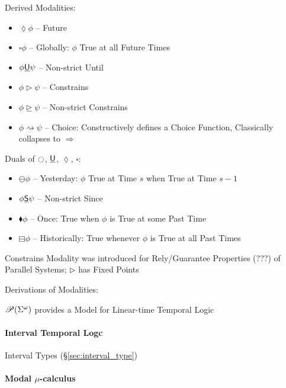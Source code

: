 Derived Modalities:
\begin{itemize}
  \item $\lozenge \phi$ -- Future
  \item $\square \phi$ -- Globally: $\phi$ True at all Future Times
  \item $\phi \underline{\mathsf{U}} \psi$ -- Non-strict Until
  \item $\phi \rhd \psi$ -- Constrains
  \item $\phi \unrhd \psi$ -- Non-strict Constrains
  \item $\phi \rightsquigarrow \psi$ -- Choice: Constructively defines
    a Choice Function, Classically collapses to $\Rightarrow$
\end{itemize}

Duals of $\ocircle$, $\underline{\mathsf{U}}$, $\lozenge$, $\square$:
\begin{itemize}
  \item $\ominus \phi$ -- Yesterday: $\phi$ True at Time $s$ when True
    at Time $s - 1$
  \item $\phi \underline{\mathsf{S}} \psi$ -- Non-strict Since
  \item $\blacklozenge \phi$ -- Once: True when $\phi$ is True at some
    Past Time
  \item $\boxminus \phi$ -- Historically: True whenever $\phi$ is True
    at all Past Times
\end{itemize}

Constrains Modality was introduced for Rely/Guarantee Properties (???)
of Parallel Systems; $\rhd$ has Fixed Points

Derivations of Modalities: %

$\mathscr{P}(\Sigma^\omega)$ provides a Model for Linear-time Temporal Logic
\cite{abramsky-gay-nagarajan96}



\paragraph{Interval Temporal Logc}\label{sec:interval_temporal}\hfill

Interval Types (\S\ref{sec:interval_type})



\paragraph{Modal $\mu$-calculus}\label{sec:modal_mu}\hfill



